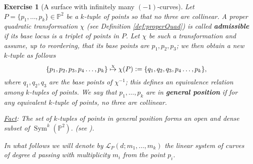 \documentclass[a4paper,11pt]{amsart}
\newtheorem{exercise}[theorem]{Exercise}
\def\Sym{\operatorname{Sym}}
\newcommand{\PP}{\mathbb{P}}
\newcommand{\defeq}{\vcentcolon=}
\begin{document}
\begin{exercise}[{A surface with infinitely many $(-1)$-curves}]\label{exer:infinite-1curves}
	Let $P = \{p_1, \dots, p_k\} \in \PP^2$ be a $k$-tuple of points so that no three are collinear.
	A proper quadratic transformation $\chi$ (see Definition \ref{def:properQuad}) is called \textbf{admissible} if its base locus is a triplet of points in $P$.
	Let $\chi$ be such a transformation and assume, up to reordering, that its base points are $p_1,p_2,p_3$;
	we then obtain a new $k$-tuple as follows
	\[
	\{p_1, p_2, p_3, p_4 \dots, p_k\} \overset{\chi}{\mapsto} \chi(P) \defeq \{q_1, q_2, q_3, p_4 \dots, p_k\},
	\]
	where $q_1, q_2, q_3$ are the base points of $\chi^{-1}$;
	this defines an equivalence relation among $k$-tuples of points.
	We say that $p_1, \dots, p_k$ are in \textbf{general position} if for any equivalent $k$-tuple of points, no three are collinear.
	\begin{center}
		\begin{minipage}{.9\textwidth}
			{\underline{Fact}}:
			The set of $k$-tuples of points in general position forms an open and dense subset of $\Sym^k(\PP^2)$. 
			(see \cite[pg.\ 409, ex.\ 4.15]{Hartshorne}).
		\end{minipage}
	\end{center}
	In what follows we will denote by $\mathcal{L}_P(d;m_1,\dots,m_k)$ the linear system of curves of degree $d$ passing with multiplicity $m_i$ from the point $p_i$.
	

\end{exercise}
\end{document}
